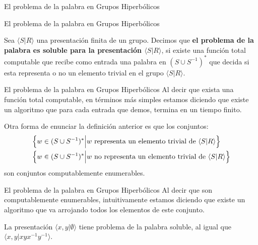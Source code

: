 \documentclass[xcolor=dvipsnames]{beamer}
\theoremstyle{largebreak}
\newcommand{\gen}[1]{\ensuremath{\langle#1\rangle}}
\begin{document}
\begin{frame}
    \begin{center}
        El problema de la palabra en Grupos Hiperbólicos
    \end{center}
\end{frame}

\begin{frame}{El problema de la palabra en Grupos Hiperbólicos}
    \begin{mydef}
        Sea $\gen{S|R}$ una presentación finita de un grupo. Decimos que \textbf{el problema de la palabra es soluble para la presentación $\gen{S|R}$}, si existe una función total computable que recibe como entrada una palabra en $(S\cup S^{-1})^{*}$ que decida si esta representa o no un elemento trivial en el grupo $\gen{S|R}$.
    \end{mydef}
\end{frame}

\begin{frame}{El problema de la palabra en Grupos Hiperbólicos}
    Al decir que exista una función total computable, en términos más simples estamos diciendo que existe un algoritmo que para cada entrada que demos, termina en un tiempo finito.

    \begin{obs}
        Otra forma de enunciar la definición anterior es que los conjuntos:
        \begin{equation*}
            \begin{split}
                &\left\{w\in(S\cup S^{-1})^*\Big|w\textup{ representa un elemento trivial de }\gen{S|R} \right\}\\
                &\left\{w\in(S\cup S^{-1})^*\Big|w\textup{ no representa un elemento trivial de }\gen{S|R} \right\}\\
            \end{split}
        \end{equation*}
        son conjuntos computablemente enumerables.
    \end{obs}
\end{frame}

\begin{frame}{El problema de la palabra en Grupos Hiperbólicos}
    Al decir que son computablemente enumerables, intuitivamente estamos diciendo que existe un algoritmo que va arrojando todos los elementos de este conjunto.

    \begin{exa}
        La presentación $\gen{x,y|\emptyset}$ tiene problema de la palabra soluble, al igual que $\gen{x,y|xyx^{-1}y^{-1}}$.
    \end{exa}
\end{frame}
\end{document}
